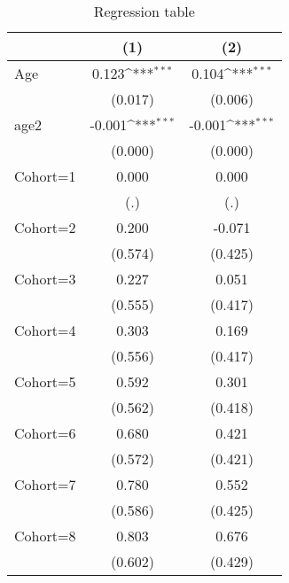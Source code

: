 \begin{table}[htbp]\centering
\def\sym#1{\ifmmode^{#1}\else\(^{#1}\)\fi}
\caption{Regression table \label{reg1}}
\begin{tabular}{l*{2}{c}}
\toprule
                    &\multicolumn{1}{c}{(1)}         &\multicolumn{1}{c}{(2)}         \\
\midrule
Age                 &       0.123\sym{***}&       0.104\sym{***}\\
                    &     (0.017)         &     (0.006)         \\
\addlinespace
age2                &      -0.001\sym{***}&      -0.001\sym{***}\\
                    &     (0.000)         &     (0.000)         \\
\addlinespace
Cohort=1            &       0.000         &       0.000         \\
                    &         (.)         &         (.)         \\
\addlinespace
Cohort=2            &       0.200         &      -0.071         \\
                    &     (0.574)         &     (0.425)         \\
\addlinespace
Cohort=3            &       0.227         &       0.051         \\
                    &     (0.555)         &     (0.417)         \\
\addlinespace
Cohort=4            &       0.303         &       0.169         \\
                    &     (0.556)         &     (0.417)         \\
\addlinespace
Cohort=5            &       0.592         &       0.301         \\
                    &     (0.562)         &     (0.418)         \\
\addlinespace
Cohort=6            &       0.680         &       0.421         \\
                    &     (0.572)         &     (0.421)         \\
\addlinespace
Cohort=7            &       0.780         &       0.552         \\
                    &     (0.586)         &     (0.425)         \\
\addlinespace
Cohort=8            &       0.803         &       0.676         \\
                    &     (0.602)         &     (0.429)         \\

\end{tabular}
\end{table}
